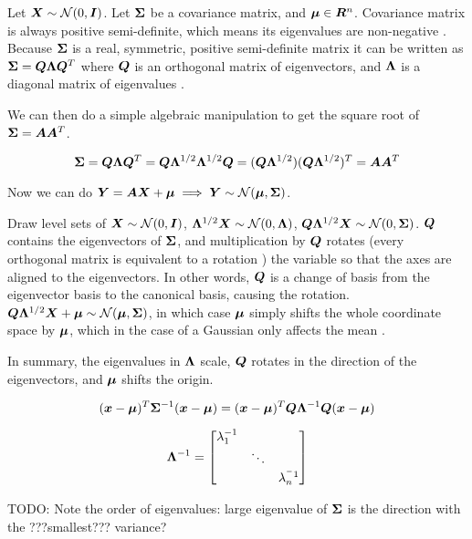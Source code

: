\begin{tcolorbox}
    Let ${\bm{X}} \sim {\mathcal{N}}(0, {\bm{I}})$. Let ${\bm{\Sigma}}$ be a covariance matrix, and ${\bm{\mu}} \in {\bm{R}}^n$. Covariance matrix is always positive semi-definite, which means its eigenvalues are non-negative . Because ${\bm{\Sigma}}$ is a real, symmetric, positive semi-definite matrix it can be written as ${\bm{\Sigma}} = {\bm{Q}} {\bm{\Lambda}} {\bm{Q}}^T$ where ${\bm{Q}}$ is an orthogonal matrix of eigenvectors, and ${\bm{\Lambda}}$ is a diagonal matrix of eigenvalues .
    
    We can then do a simple algebraic manipulation to get the square root of ${\bm{\Sigma}} = {\bm{A}} {\bm{A}}^T$. 
    
    \begin{equation}
        {\bm{\Sigma}} = {\bm{Q}} {\bm{\Lambda}} {\bm{Q}}^T = {\bm{Q}} {\bm{\Lambda}}^{1/2} {\bm{\Lambda}}^{1/2} {\bm{Q}} = ({\bm{Q}} {\bm{\Lambda}}^{1/2}) ({\bm{Q}} {\bm{\Lambda}}^{1/2})^T = {\bm{A}} {\bm{A}}^T
    \end{equation}
    
    Now we can do ${\bm{Y}} = {\bm{A}} {\bm{X}} + {\bm{\mu}} \implies {\bm{Y}} \sim {\mathcal{N}}({\bm{\mu}}, {\bm{\Sigma}})$.
    
    Draw level sets of ${\bm{X}} \sim {\mathcal{N}}(0, {\bm{I}})$, ${\bm{\Lambda}}^{1/2} {\bm{X}} \sim {\mathcal{N}}(0, {\bm{\Lambda}})$, ${\bm{Q}} {\bm{\Lambda}}^{1/2} {\bm{X}} \sim {\mathcal{N}}(0, {\bm{\Sigma}})$. ${\bm{Q}}$ contains the eigenvectors of ${\bm{\Sigma}}$, and multiplication by ${\bm{Q}}$ rotates (every orthogonal matrix is equivalent to a rotation ) the variable so that the axes are aligned to the eigenvectors. In other words, ${\bm{Q}}$ is a change of basis from the eigenvector basis to the canonical basis, causing the rotation. ${\bm{Q}} {\bm{\Lambda}}^{1/2} {\bm{X}} + {\bm{\mu}} \sim {\mathcal{N}}({\bm{\mu}}, {\bm{\Sigma}})$, in which case ${\bm{\mu}}$ simply shifts the whole coordinate space by ${\bm{\mu}}$, which in the case of a Gaussian only affects the mean .
    
    In summary, the eigenvalues in ${\bm{\Lambda}}$ scale, ${\bm{Q}}$ rotates in the direction of the eigenvectors, and ${\bm{\mu}}$ shifts the origin.
    
    \begin{equation}
        ({\bm{x}} - {\bm{\mu}})^T {\bm{\Sigma}}^{-1} ({\bm{x}} - {\bm{\mu}}) = ({\bm{x}} - {\bm{\mu}})^T {\bm{Q}} {\bm{\Lambda}}^{-1} {\bm{Q}} ({\bm{x}} - {\bm{\mu}})
    \end{equation}
    
    \begin{equation}
        {\bm{\Lambda}}^{-1} = \begin{bmatrix}
            \lambda_1^{-1} & & \\
            & \ddots & \\
            & & \lambda_n^{^-1}
        \end{bmatrix}
    \end{equation}
    
    TODO: Note the order of eigenvalues: large eigenvalue of ${\bm{\Sigma}}$ is the direction with the ???smallest??? variance?
\end{tcolorbox}







